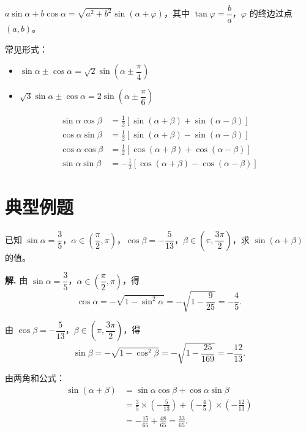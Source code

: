 \documentclass[11pt]{ctexrep}
\begin{document}
\begin{property}[辅助角公式]
    $a\sin\alpha + b\cos\alpha = \sqrt{a^2 + b^2}\sin(\alpha + \varphi)$，其中 $\tan\varphi = \dfrac{b}{a}$，$\varphi$ 的终边过点 $(a, b)$。
    
    常见形式：
    \begin{itemize}
        \item $\sin\alpha \pm \cos\alpha = \sqrt{2}\sin\left(\alpha \pm \dfrac{\pi}{4}\right)$
        \item $\sqrt{3}\sin\alpha \pm \cos\alpha = 2\sin\left(\alpha \pm \dfrac{\pi}{6}\right)$
    \end{itemize}
\end{property}

\begin{property}[积化和差与和差化积]
    \begin{align*}
        \sin\alpha\cos\beta &= \frac{1}{2}[\sin(\alpha + \beta) + \sin(\alpha - \beta)] \\
        \cos\alpha\sin\beta &= \frac{1}{2}[\sin(\alpha + \beta) - \sin(\alpha - \beta)] \\
        \cos\alpha\cos\beta &= \frac{1}{2}[\cos(\alpha + \beta) + \cos(\alpha - \beta)] \\
        \sin\alpha\sin\beta &= -\frac{1}{2}[\cos(\alpha + \beta) - \cos(\alpha - \beta)]
    \end{align*}
\end{property}

\section*{典型例题}

\begin{example}[两角和差公式的应用]
    已知 $\sin\alpha = \dfrac{3}{5}$，$\alpha \in \left(\dfrac{\pi}{2}, \pi\right)$，$\cos\beta = -\dfrac{5}{13}$，$\beta \in \left(\pi, \dfrac{3\pi}{2}\right)$，求 $\sin(\alpha + \beta)$ 的值。
\end{example}

\textbf{解.} 由 $\sin\alpha = \dfrac{3}{5}$，$\alpha \in \left(\dfrac{\pi}{2}, \pi\right)$，得
\[
    \cos\alpha = -\sqrt{1 - \sin^2\alpha} = -\sqrt{1 - \frac{9}{25}} = -\frac{4}{5}.
\]

由 $\cos\beta = -\dfrac{5}{13}$，$\beta \in \left(\pi, \dfrac{3\pi}{2}\right)$，得
\[
    \sin\beta = -\sqrt{1 - \cos^2\beta} = -\sqrt{1 - \frac{25}{169}} = -\frac{12}{13}.
\]

由两角和公式：
\begin{align*}
    \sin(\alpha + \beta) &= \sin\alpha\cos\beta + \cos\alpha\sin\beta \\
    &= \frac{3}{5} \times \left(-\frac{5}{13}\right) + \left(-\frac{4}{5}\right) \times \left(-\frac{12}{13}\right) \\
    &= -\frac{15}{65} + \frac{48}{65} = \frac{33}{65}.
\end{align*}
\end{document}

